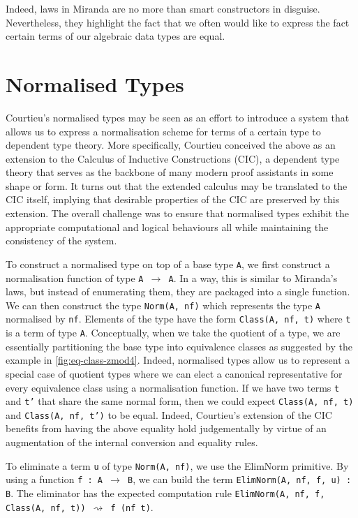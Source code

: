 \documentclass[12pt,twoside,maitrise]{dms}
\theoremstyle{definition}
\numberwithin{equation}{section}
\numberwithin{table}{chapter}
\numberwithin{figure}{chapter}
\newcommand\kw[1] {\textsf{#1}}
\newcommand\id[1] {\texttt{#1}}
\newcommand\fn[1] {\texttt{#1}}
\begin{document}
Indeed, laws in Miranda are no more than smart constructors in disguise.
Nevertheless, they highlight the fact that we often would like to express the
fact certain terms of our algebraic data types are equal.

\section{Normalised Types}\label{sec:normalised-types-courtieu}

Courtieu's normalised types\cite{courtieu-normalizedtypes} may be seen as an
effort to introduce a system that allows us to express a normalisation scheme
for terms of a certain type to dependent type theory. More specifically,
Courtieu conceived the above as an extension to the Calculus of Inductive
Constructions (CIC)\cite{werner-cic}, a dependent type theory that serves as the
backbone of many modern proof assistants in some shape or form. It turns out
that the extended calculus may be translated to the CIC itself, implying that
desirable properties of the CIC are preserved by this extension. The overall
challenge was to ensure that normalised types exhibit the appropriate
computational and logical behaviours all while maintaining the consistency of
the system.

To construct a normalised type on top of a base type \id{A}, we first construct
a normalisation function of type \fn{A $\rightarrow$ A}. In a way, this is
similar to Miranda's laws, but instead of enumerating them, they are packaged
into a single function. We can then construct the type \fn{\kw{Norm}(A, nf)}
which represents the type \id{A} normalised by \id{nf}. Elements of the type
have the form \fn{\kw{Class}(A, nf, t)} where \id{t} is a term of type \id{A}.
Conceptually, when we take the quotient of a type, we are essentially
partitioning the base type into equivalence classes as suggested by the example
in \autoref{fig:eq-class-zmod4}. Indeed, normalised types allow us to represent
a special case of quotient types where we can elect a canonical representative
for every equivalence class using a normalisation function. If we have two terms
\id{t} and \id{t'} that share the same normal form, then we could expect
\fn{\kw{Class}(A, nf, t)} and \fn{\kw{Class}(A, nf, t')} to be equal. Indeed,
Courtieu's extension of the CIC benefits from having the above equality hold
judgementally by virtue of an augmentation of the internal conversion and
equality rules.

To eliminate a term \id{u} of type \fn{\kw{Norm}(A, nf)}, we use the
\kw{ElimNorm} primitive. By using a function \fn{f : A $\rightarrow$ B}, we can
build the term \fn{\kw{ElimNorm}(A, nf, f, u) : B}. The eliminator has the
expected computation rule \fn{\kw{ElimNorm}(A, nf, f, \kw{Class}(A, nf, t))
  $\rightsquigarrow{}$ f (nf t)}.
\end{document}
